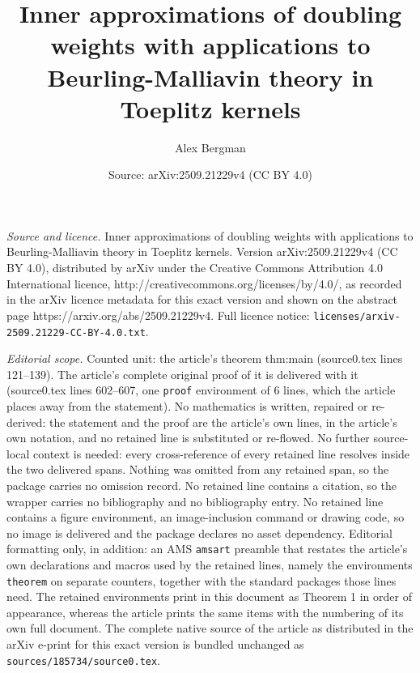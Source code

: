 \documentclass[10pt,a4paper]{amsart}
\title{Inner approximations of doubling weights with applications to Beurling-Malliavin theory in Toeplitz kernels}
\author{Alex Bergman}
\date{Source: arXiv:2509.21229v4 (CC BY 4.0)}
\begin{document}
\maketitle

\noindent\emph{Source and licence.} Inner approximations of doubling weights with applications to Beurling-Malliavin theory in Toeplitz kernels. Version arXiv:2509.21229v4 (CC BY 4.0), distributed by arXiv under the Creative Commons Attribution 4.0 International licence, http://creativecommons.org/licenses/by/4.0/, as recorded in the arXiv licence metadata for this exact version and shown on the abstract page https://arxiv.org/abs/2509.21229v4. Full licence notice: \texttt{licenses/arxiv-2509.21229-CC-BY-4.0.txt}.\par\smallskip

\noindent\textit{Editorial scope.} Counted unit: the article's theorem thm:main (source0.tex lines 121--139). The article's complete original proof of it is delivered with it (source0.tex lines 602--607, one \texttt{proof} environment of 6 lines, which the article places away from the statement). No mathematics is written, repaired or re-derived: the statement and the proof are the article's own lines, in the article's own notation, and no retained line is substituted or re-flowed.  No further source-local context is needed: every cross-reference of every retained line resolves inside the two delivered spans.  Nothing was omitted from any retained span, so the package carries no omission record.  No retained line contains a citation, so the wrapper carries no bibliography and no bibliography entry.  No retained line contains a figure environment, an image-inclusion command or drawing code, so no image is delivered and the package declares no asset dependency.  Editorial formatting only, in addition: an AMS \texttt{amsart} preamble that restates the article's own declarations and macros used by the retained lines, namely the environments \texttt{theorem} on separate counters, together with the standard packages those lines need.  The retained environments print in this document as Theorem 1 in order of appearance, whereas the article prints the same items with the numbering of its own full document.  The complete native source of the article as distributed in the arXiv e-print for this exact version is bundled unchanged as \texttt{sources/185734/source0.tex}.
\end{document}
